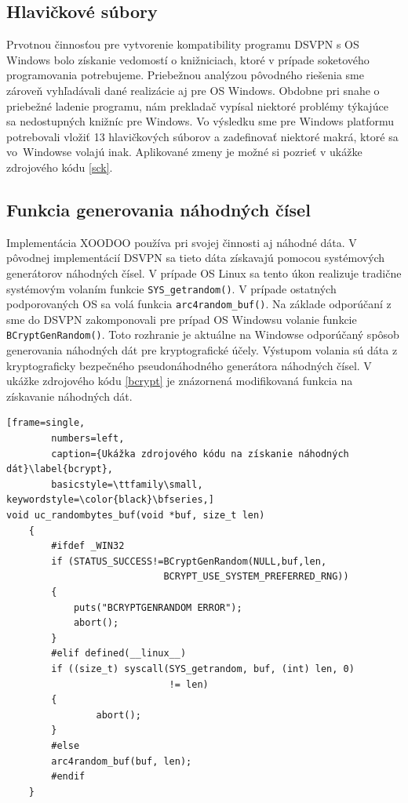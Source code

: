 \subsection{Hlavičkové súbory}
Prvotnou činnosťou pre vytvorenie kompatibility programu DSVPN s OS Windows bolo získanie vedomostí o knižniciach, ktoré v prípade soketového programovania potrebujeme. Priebežnou analýzou pôvodného riešenia sme zároveň vyhľadávali dané realizácie aj pre OS Windows. Obdobne pri snahe o priebežné ladenie programu, nám prekladač vypísal niektoré problémy týkajúce sa nedostupných knižníc pre Windows. Vo výsledku sme pre Windows platformu potrebovali vložiť 13 hlavičkových súborov a zadefinovať niektoré makrá, ktoré sa vo~Windowse volajú inak. Aplikované zmeny je možné si pozrieť v ukážke zdrojového kódu \ref{sck}. 
\subsection{Funkcia generovania náhodných čísel}
Implementácia XOODOO používa pri svojej činnosti aj náhodné dáta. V pôvodnej implementácií DSVPN sa tieto dáta získavajú pomocou systémových generátorov náhodných čísel. V prípade OS Linux sa tento úkon realizuje tradične systémovým volaním funkcie \lstinline|SYS_getrandom()|. V prípade ostatných podporovaných OS sa volá funkcia \lstinline|arc4random_buf()|. 
Na základe odporúčaní z \cite{bc} sme do DSVPN zakomponovali pre prípad OS Windowsu volanie funkcie \\\lstinline|BCryptGenRandom()|. Toto rozhranie je aktuálne na Windowse odporúčaný spôsob generovania náhodných dát pre kryptografické účely. Výstupom volania sú dáta z kryptograficky bezpečného pseudonáhodného generátora náhodných čísel. V ukážke zdrojového kódu \ref{bcrypt} je znázornená modifikovaná funkcia na získavanie náhodných dát. 

\begin{minipage}{\linewidth} 	
	\begin{lstlisting}[frame=single,
		numbers=left,
		caption={Ukážka zdrojového kódu na získanie náhodných dát}\label{bcrypt},
		basicstyle=\ttfamily\small, keywordstyle=\color{black}\bfseries,]
void uc_randombytes_buf(void *buf, size_t len)
	{
		#ifdef _WIN32
		if (STATUS_SUCCESS!=BCryptGenRandom(NULL,buf,len, 
		                    BCRYPT_USE_SYSTEM_PREFERRED_RNG))
		{
			puts("BCRYPTGENRANDOM ERROR");
			abort();
		}
		#elif defined(__linux__)  
		if ((size_t) syscall(SYS_getrandom, buf, (int) len, 0)
		                     != len) 
		{
				abort();
		}
		#else
		arc4random_buf(buf, len);
		#endif
	}	
	\end{lstlisting}
\end{minipage}\\

